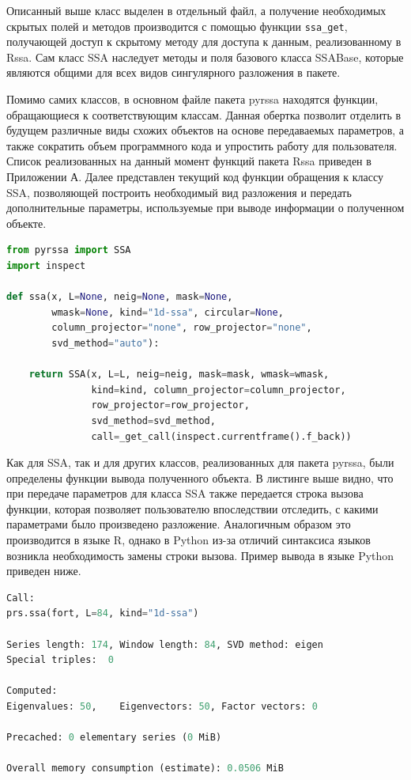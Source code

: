 \documentclass[specialist,
			   substylefile = spbu_report.rtx,
			   subf,href,colorlinks=true, 12pt]{disser}
\begin{document}
Описанный выше класс выделен в отдельный файл, а получение необходимых скрытых полей и методов производится с помощью функции \verb|ssa_get|, получающей доступ к скрытому методу для доступа к данным, реализованному в Rssa. Сам класс SSA наследует методы и поля базового класса SSABase, которые являются общими для всех видов сингулярного разложения в пакете. 
	
Помимо самих классов, в основном файле пакета pyrssa находятся функции, обращающиеся к соответствующим классам. Данная обертка позволит отделить в будущем различные виды схожих объектов на основе передаваемых параметров, а также сократить объем программного кода и упростить работу для пользователя. Список реализованных на данный момент функций пакета Rssa приведен в Приложении А. Далее представлен текущий код функции обращения к классу SSA, позволяющей построить необходимый вид разложения и передать дополнительные параметры, используемые при выводе информации о полученном объекте.

\begin{lstlisting}[language=Python, caption=Реализация функции для обращения к типу данных SSA в Python.]
from pyrssa import SSA
import inspect

def ssa(x, L=None, neig=None, mask=None,
        wmask=None, kind="1d-ssa", circular=None,
        column_projector="none", row_projector="none",
        svd_method="auto"):
	
	return SSA(x, L=L, neig=neig, mask=mask, wmask=wmask,
	           kind=kind, column_projector=column_projector,
	           row_projector=row_projector,
	           svd_method=svd_method,
	           call=_get_call(inspect.currentframe().f_back))
\end{lstlisting}

Как для SSA, так и для других классов, реализованных для пакета pyrssa, были определены функции вывода полученного объекта. В листинге выше видно, что при передаче параметров для класса SSA также передается строка вызова функции, которая позволяет пользователю впоследствии отследить, с какими параметрами было произведено разложение. Аналогичным образом это производится в языке R, однако в Python из-за отличий синтаксиса языков возникла необходимость замены строки вызова. Пример вывода в языке Python приведен ниже.

\begin{lstlisting}[language=Python, caption=Вывод объекта SSA в языке Python.]
Call:
prs.ssa(fort, L=84, kind="1d-ssa")

Series length: 174,	Window length: 84, SVD method: eigen
Special triples:  0

Computed:
Eigenvalues: 50,	Eigenvectors: 50, Factor vectors: 0

Precached: 0 elementary series (0 MiB)

Overall memory consumption (estimate): 0.0506 MiB
\end{lstlisting}
\end{document}
